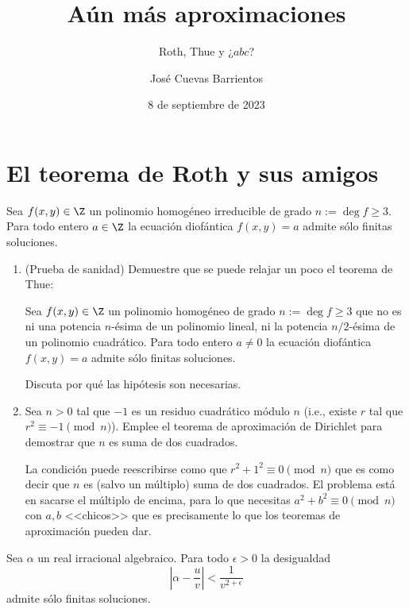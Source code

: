 \documentclass[11pt, reqno]{amsart}
\title{Aún más aproximaciones}
\subtitle{Roth, Thue y ¿$abc$?}
\date{8 de septiembre de 2023}
\author[José Cuevas]{José Cuevas Barrientos}
\begin{document}
\maketitle

\section{El teorema de Roth y sus amigos}
\begin{thm}[Thue]
	Sea $f(x, y) \in \Z$ un polinomio homogéneo irreducible de grado $n := \deg f \ge 3$.
	Para todo entero $a \in \Z$ la ecuación diofántica $f(x, y) = a$ admite sólo finitas soluciones.
\end{thm}

\begin{enumerate}
	\item (Prueba de sanidad) Demuestre que se puede relajar un poco el teorema de Thue:
		
		Sea $f(x, y) \in \Z$ un polinomio homogéneo de grado $n := \deg f \ge 3$ que no es ni una potencia $n$-ésima de un polinomio lineal,
		ni la potencia $n/2$-ésima de un polinomio cuadrático.
		Para todo entero $a \ne 0$ la ecuación diofántica $f(x, y) = a$ admite sólo finitas soluciones.

		Discuta por qué las hipótesis son necesarias.

	\item \hard
		Sea $n > 0$ tal que $-1$ es un residuo cuadrático módulo $n$ (i.e., existe $r$ tal que $r^2 \equiv -1 \pmod n$).
		Emplee el teorema de aproximación de Dirichlet para demostrar que $n$ es suma de dos cuadrados.

		\begin{hint}
			La condición puede reescribirse como que $r^2 + 1^2 \equiv 0 \pmod n$ que es como decir que $n$ es (salvo un múltiplo)
			suma de dos cuadrados.
			El problema está en sacarse el múltiplo de encima, para lo que necesitas $a^2 + b^2 \equiv 0 \pmod n$ con $a, b$ <<chicos>>
			que es precisamente lo que los teoremas de aproximación pueden dar.
		\end{hint}
\end{enumerate}

\begin{thm}[Roth, 1955]
	Sea $\alpha$ un real irracional algebraico.
	Para todo $\epsilon > 0$ la desigualdad
	$$ \left| \alpha - \frac{u}{v} \right| < \frac{1}{v^{2 + \epsilon}} $$
	admite sólo finitas soluciones.
\end{thm}
\end{document}
